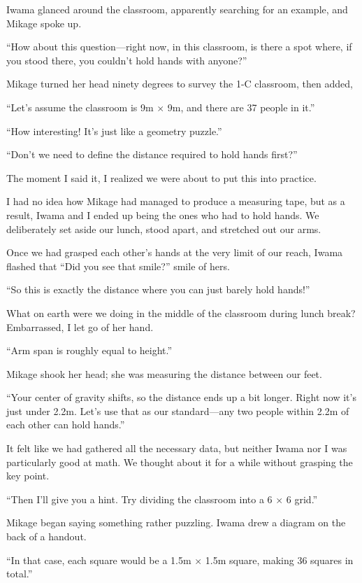 \documentclass[
    a4paper,
    12pt,
    twoside,
    openany,
    UTF8,
    fontset=windows
]{ctexbook}
\begin{document}
Iwama glanced around the classroom, apparently searching for an example, and Mikage spoke up.

``How about this question---right now, in this classroom, is there a spot where, if you stood there, you couldn't hold hands with anyone?''

Mikage turned her head ninety degrees to survey the 1-C classroom, then added,

``Let's assume the classroom is 9m $\times$ 9m, and there are 37 people in it.''

``How interesting! It's just like a geometry puzzle.''

``Don't we need to define the distance required to hold hands first?''

The moment I said it, I realized we were about to put this into practice.

I had no idea how Mikage had managed to produce a measuring tape, but as a result, Iwama and I ended up being the ones who had to hold hands. We deliberately set aside our lunch, stood apart, and stretched out our arms.

Once we had grasped each other's hands at the very limit of our reach, Iwama flashed that ``Did you see that smile?'' smile of hers.

``So this is exactly the distance where you can just barely hold hands!''

What on earth were we doing in the middle of the classroom during lunch break? Embarrassed, I let go of her hand.

``Arm span is roughly equal to height.''

Mikage shook her head; she was measuring the distance between our feet.

``Your center of gravity shifts, so the distance ends up a bit longer. Right now it's just under 2.2m. Let's use that as our standard---any two people within 2.2m of each other can hold hands.''

It felt like we had gathered all the necessary data, but neither Iwama nor I was particularly good at math. We thought about it for a while without grasping the key point.

``Then I'll give you a hint. Try dividing the classroom into a 6 $\times$ 6 grid.''

Mikage began saying something rather puzzling. Iwama drew a diagram on the back of a handout.

``In that case, each square would be a 1.5m $\times$ 1.5m square, making 36 squares in total.''
\end{document}
